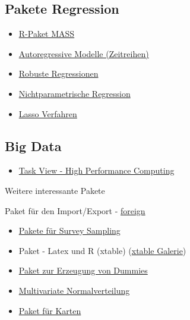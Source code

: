 \documentclass[]{article}
\providecommand{\tightlist}{%
  \setlength{\itemsep}{0pt}\setlength{\parskip}{0pt}}
\begin{document}
\subsection{Pakete Regression}\label{pakete-regression}

\begin{itemize}
\item
  \href{http://cran.r-project.org/web/packages/MASS/MASS.pdf}{R-Paket
  MASS}
\item
  \href{http://cran.r-project.org/web/packages/tsDyn/vignettes/tsDyn.pdf}{Autoregressive
  Modelle (Zeitreihen)}
\item
  \href{http://robustbase.r-forge.r-project.org/}{Robuste Regressionen}
\item
  \href{http://journal.r-project.org/archive/2012-2/RJournal_2012-2_Nie+S~Racine.pdf}{Nichtparametrische
  Regression}
\item
  \href{http://web.stanford.edu/~hastie/glmnet/glmnet_alpha.html}{Lasso
  Verfahren}
\end{itemize}

\subsection{Big Data}\label{big-data}

\begin{itemize}
\tightlist
\item
  \href{http://cran.r-project.org/web/views/HighPerformanceComputing.html}{Task
  View - High Performance Computing}
\end{itemize}

Weitere interessante Pakete

Paket für den Import/Export -
\href{http://cran.r-project.org/web/packages/foreign/foreign.pdf}{foreign}

\begin{itemize}
\item
  \href{http://iase-web.org/documents/papers/icots8/ICOTS8_4J1_TILLE.pdf}{Pakete
  für Survey Sampling}
\item
  Paket - Latex und R (xtable)
  (\href{http://cran.r-project.org/web/packages/xtable/vignettes/xtableGallery.pdf}{xtable
  Galerie})
\item
  \href{http://cran.r-project.org/web/packages/dummies/dummies.pdf}{Paket
  zur Erzeugung von Dummies}
\item
  \href{http://cran.r-project.org/web/packages/mvtnorm/index.html}{Multivariate
  Normalverteilung}
\item
  \href{http://www.r-bloggers.com/tag/maptools/}{Paket für Karten}
\end{itemize}
\end{document}
